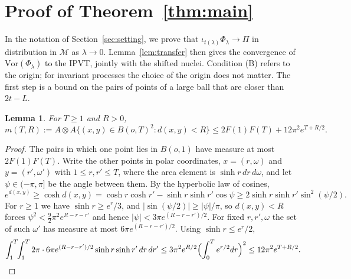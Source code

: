 \documentclass[11pt]{amsart}
\newtheorem{lemma}[theorem]{Lemma}
\theoremstyle{definition}
\theoremstyle{remark}
\newcommand{\M}{\mathcal{M}}
\newcommand{\Vor}{\mathrm{Vor}}
\newcommand{\area}{A}
\begin{document}
\section{Proof of Theorem~\ref{thm:main}}\label{sec:main}

In the notation of Section~\ref{sec:setting}, we prove that $\iota_{t(\lambda)}\Phi_\lambda\to\Pi$ in distribution in
$\M$ as $\lambda\to0$. Lemma~\ref{lem:transfer} then gives the convergence of $\Vor(\Phi_\lambda)$ to the IPVT, jointly
with the shifted nuclei. Condition (B) refers to the origin; for invariant processes the choice of the origin does not
matter. The first step is a bound on the pairs of points of a large ball that are closer than $2t-L$.

\begin{lemma}\label{lem:pairs}
For $T\ge1$ and $R>0$,
\[
  m(T,R):=\area\otimes\area\bigl\{(x,y)\in B(o,T)^2: d(x,y)<R\bigr\}\le 2F(1)F(T)+12\pi^2e^{T+R/2}.
\]
\end{lemma}

\begin{proof}
The pairs in which one point lies in $B(o,1)$ have measure at most $2F(1)F(T)$. Write the other points in polar
coordinates, $x=(r,\omega)$ and $y=(r',\omega')$ with $1\le r,r'\le T$, where the area element is
$\sinh r\,dr\,d\omega$, and
let $\psi\in(-\pi,\pi]$ be the angle between them. By the hyperbolic law of cosines,
\[
  e^{d(x,y)}\ge\cosh d(x,y)=\cosh r\cosh r'-\sinh r\sinh r'\cos\psi\ge 2\sinh r\sinh r'\sin^2(\psi/2).
\]
For $r\ge1$ we have $\sinh r\ge e^r/3$, and $|\sin(\psi/2)|\ge|\psi|/\pi$, so $d(x,y)<R$ forces
$\psi^2<\tfrac92\pi^2e^{R-r-r'}$ and hence $|\psi|<3\pi e^{(R-r-r')/2}$. For fixed $r,r',\omega$ the set of such $\omega'$
has measure at most $6\pi e^{(R-r-r')/2}$. Using $\sinh r\le e^r/2$,
\[
  \int_1^T\!\!\int_1^T 2\pi\cdot6\pi e^{(R-r-r')/2}\sinh r\sinh r'\,dr\,dr'\le 3\pi^2e^{R/2}\Bigl(\int_0^Te^{r/2}dr\Bigr)^2
  \le12\pi^2e^{T+R/2}.\qedhere
\]
\end{proof}
\end{document}
